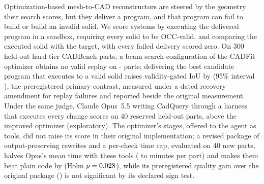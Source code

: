 Optimization-based mesh-to-CAD reconstructors are steered by the geometry their search scores, but they deliver a program, and that program can fail to build or build an invalid solid. We score systems by executing the delivered program in a sandbox, requiring every solid to be OCC-valid, and comparing the executed solid with the target, with every failed delivery scored zero. On 300 held-out hard-tier CADBench parts, a beam-search configuration of the CADFit optimizer obtains no valid replay on \the{}-\fDZeroValid\relax{} parts; delivering the best candidate program that executes to a valid solid raises validity-gated IoU by \hDXvsDZero{} (95\% interval \hDXvsDZeroCI), the preregistered primary contrast, measured under a dated recovery amendment for replay failures and reported beside the original measurement. Under the same judge, Claude Opus~5.5 writing CadQuery through a harness that executes every change scores \cOpusCode{} on 40 reserved held-out parts, \cOpusCodeVsVThree{} above the improved optimizer (exploratory). The optimizer's stages, offered to the agent as tools, did not raise its score in their original implementation; a revised package of output-preserving rewrites and a per-check time cap, evaluated on 40 new parts, halves Opus's mean time with these tools (\tOpusSkillsVTwoMin{} to \tOpusSkillsVThreeMin{} minutes per part) and makes them beat plain code by \tOpusSkillsVsCode{} (Holm $p=0.028$), while its preregistered quality gain over the original package (\tOpusSkillsVersion) is not significant by its declared sign test.
